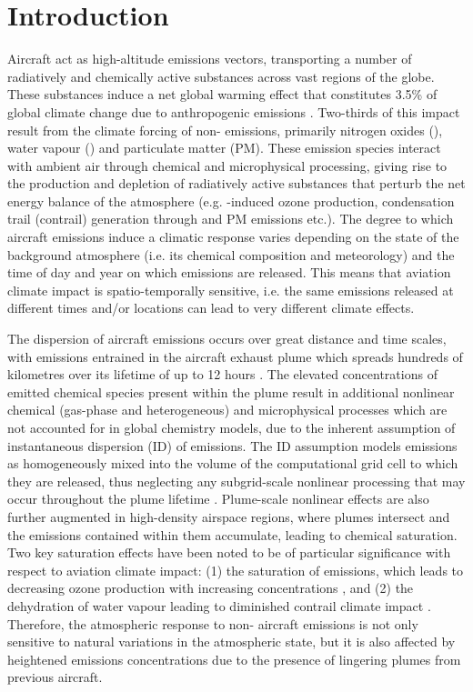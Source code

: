 \section{Introduction}
Aircraft act as high-altitude emissions vectors, transporting a number of radiatively and chemically active substances across vast regions of the globe. These substances induce a net global warming effect that constitutes 3.5\% of global climate change due to anthropogenic emissions \cite{Lee2021}. Two-thirds of this impact result from the climate forcing of non- emissions, primarily nitrogen oxides (), water vapour () and particulate matter (PM). These emission species interact with ambient air through chemical and microphysical processing, giving rise to the production and depletion of radiatively active substances that perturb the net energy balance of the atmosphere (e.g. -induced ozone production, condensation trail (contrail) generation through  and PM emissions etc.). The degree to which aircraft emissions induce a climatic response varies depending on the state of the background atmosphere (i.e. its chemical composition and meteorology) and the time of day and year on which emissions are released. This means that aviation climate impact is spatio-temporally sensitive, i.e. the same emissions released at different times and/or locations can lead to very different climate effects. 

The dispersion of aircraft emissions occurs over great distance and time scales, with emissions entrained in the aircraft exhaust plume which spreads hundreds of kilometres \cite{Kraabol2000a} over its lifetime of up to 12 hours \cite{EPA1992}. The elevated concentrations of emitted chemical species present within the plume result in additional nonlinear chemical (gas-phase and heterogeneous) and microphysical processes which are not accounted for in global chemistry models, due to the inherent assumption of instantaneous dispersion (ID) of emissions. The ID assumption models emissions as homogeneously mixed into the volume of the computational grid cell to which they are released, thus neglecting any subgrid-scale nonlinear processing that may occur throughout the plume lifetime \cite{Paoli2011}. Plume-scale nonlinear effects are also further augmented in high-density airspace regions, where plumes intersect and the emissions contained within them accumulate, leading to chemical saturation. Two key saturation effects have been noted to be of particular significance with respect to aviation climate impact: (1) the saturation of  emissions, which leads to decreasing ozone production with increasing  concentrations \cite{Jaegle1999}, and (2) the dehydration of water vapour leading to diminished contrail climate impact \cite{Schumann2015}. Therefore, the atmospheric response to non- aircraft emissions is not only sensitive to natural variations in the atmospheric state, but it is also affected by heightened emissions concentrations due to the presence of lingering plumes from previous aircraft.

